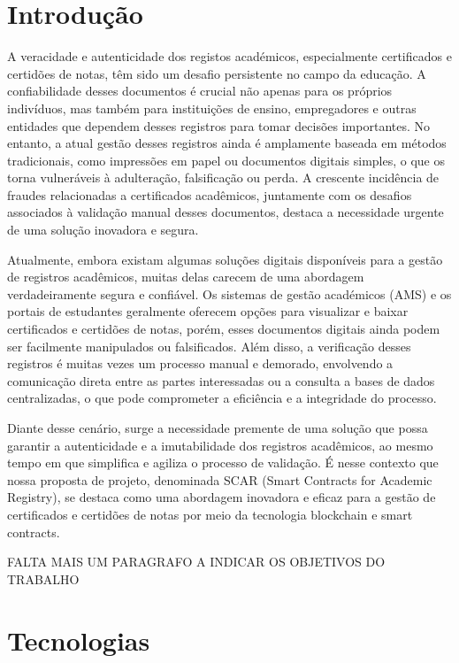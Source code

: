 \documentclass[10pt]{article}
\begin{document}
\section{Introdução}

A veracidade e autenticidade dos registos académicos, especialmente certificados e certidões de notas,
têm sido um desafio persistente no campo da educação. A confiabilidade desses documentos é crucial não apenas
para os próprios indivíduos, mas também para instituições de ensino, empregadores e outras entidades que
dependem desses registros para tomar decisões importantes. No entanto, a atual gestão desses registros
ainda é amplamente baseada em métodos tradicionais, como impressões em papel ou documentos digitais simples,
o que os torna vulneráveis à adulteração, falsificação ou perda. A crescente incidência de fraudes
relacionadas a certificados acadêmicos, juntamente com os desafios associados à validação manual desses
documentos, destaca a necessidade urgente de uma solução inovadora e segura.

Atualmente, embora existam algumas soluções digitais disponíveis para a gestão de registros acadêmicos,
muitas delas carecem de uma abordagem verdadeiramente segura e confiável. Os sistemas de gestão académicos
(AMS) e os portais de estudantes geralmente oferecem opções para visualizar e baixar certificados e certidões
de notas, porém, esses documentos digitais ainda podem ser facilmente manipulados ou falsificados. Além disso,
a verificação desses registros é muitas vezes um processo manual e demorado, envolvendo a comunicação direta entre
as partes interessadas ou a consulta a bases de dados centralizadas, o que pode comprometer a eficiência
e a integridade do processo.

Diante desse cenário, surge a necessidade premente de uma solução que possa garantir a autenticidade e a
imutabilidade dos registros acadêmicos, ao mesmo tempo em que simplifica e agiliza o processo de validação.
É nesse contexto que nossa proposta de projeto, denominada SCAR (Smart Contracts for Academic Registry),
se destaca como uma abordagem inovadora e eficaz para a gestão de certificados e certidões de notas por
meio da tecnologia blockchain e smart contracts.

FALTA MAIS UM PARAGRAFO A INDICAR OS OBJETIVOS DO TRABALHO

\section*{Tecnologias}
\end{document}
